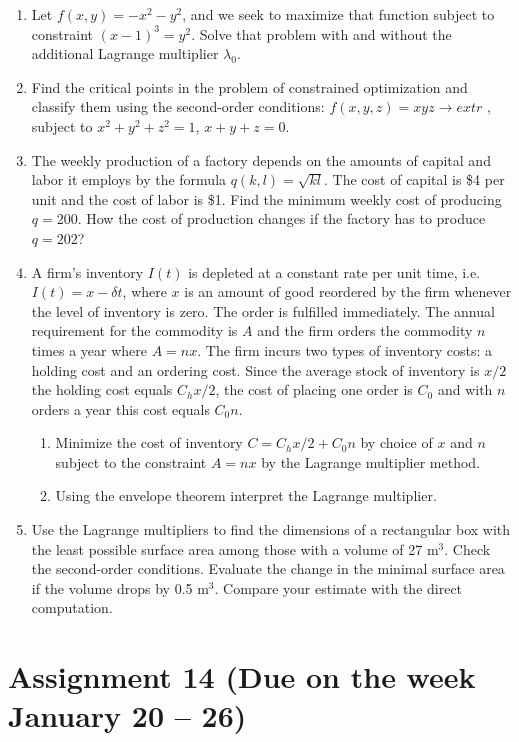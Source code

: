 \documentclass[12pt]{article} %
\theoremstyle{definition} %
\begin{document}
\begin{enumerate}
\item Let $f(x,y)=-x^2-y^2$, and we seek to maximize that function subject to constraint $(x-1)^3=y^2$. Solve that problem with and without the additional Lagrange multiplier $\lambda_0$.

\item Find the critical points in the problem of constrained optimization and classify them using the second-order conditions: $f(x,y,z)=xyz\rightarrow extr$ , subject to $x^2+y^2+z^2=1$, $x+y+z=0$.

\item The weekly production of a factory depends on the amounts of capital and labor it employs by the formula $q(k,l)=\sqrt{kl}$. The cost of capital is \$4 per unit and the cost of labor is \$1. Find the minimum weekly cost of producing $q=200$. How the cost of production changes if the factory has to produce $q=202$?

\item A firm's inventory $I(t)$ is depleted at a constant rate per unit time, i.e. $I(t)=x-\delta t$, where $x$ is an amount of good reordered by the firm whenever the level of inventory is zero. The order is fulfilled immediately. The annual requirement for the commodity is $A$ and the firm orders the commodity $n$ times a year where $A=nx$. The firm incurs two types of inventory costs: a holding cost and an ordering cost. Since the average stock of inventory is $x/2$ the holding cost equals $C_hx/2$, the cost of placing one order is $C_0$ and with $n$ orders a year this cost equals $C_0n$.
\begin{enumerate} 
\item Minimize the cost of inventory $C=C_hx/2+C_0n$ by choice of $x$ and $n$ subject to the constraint $A=nx$ by the Lagrange multiplier method.
\item Using the envelope theorem interpret the Lagrange multiplier.
\end{enumerate}
\item Use the Lagrange multipliers to find the dimensions of a rectangular box with the least possible surface area among those with a volume of 27 m$^3$. Check the second-order conditions. Evaluate the change in the minimal surface area if the volume drops by 0.5 m$^3$. Compare your estimate with the direct computation.
\end{enumerate}



\section*{Assignment 14 (Due on the week January 20 – 26)}
\end{document}

